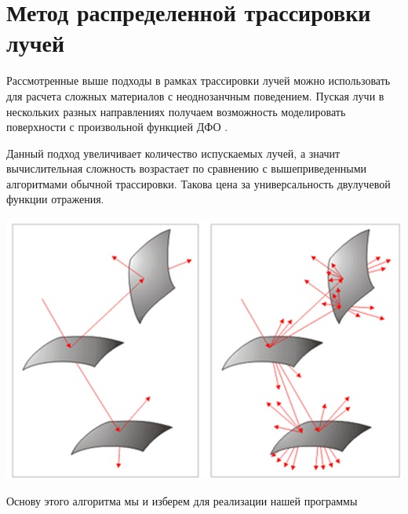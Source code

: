 \newpage
\section*{Метод распределенной трассировки лучей} 

Рассмотренные выше подходы в рамках трассировки лучей можно использовать для расчета сложных материалов с неоднозанчным поведением. Пуская лучи в нескольких разных направлениях получаем возможность моделировать поверхности с произвольной функцией ДФО \cite{ray-tracing}.

Данный подход увеличивает количество испускаемых лучей, а значит вычислительная сложность возрастает по сравнению с вышеприведенными алгоритмами обычной трассировки. Такова цена за универсальность двулучевой функции отражения. 

\begin{center}
\includegraphics[width=0.7\linewidth]{ray-tracing-wide.jpg}
\end{center}

Основу этого алгоритма мы и изберем для реализации нашей программы